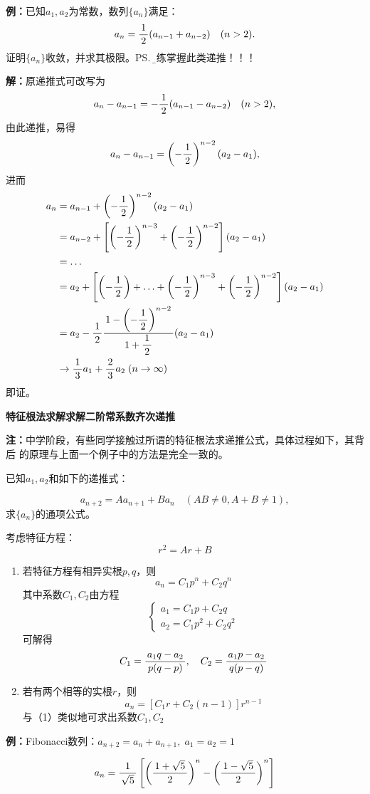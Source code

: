 {\bf 例：}已知$a_1,a_2$为常数，数列$\{a_n\}$满足：
$$a_n=\displaystyle\frac{\,{1}\,}{\,{2}\,}({a_{n-1}+a_{n-2}})\quad(n>2).$$
证明$\{a_n\}$收敛，并求其极限。\ps{\b 熟练掌握此类递推！！！}

{\bf 解：}原递推式可改写为
$$a_n-a_{n-1}=-\displaystyle\frac{\,{1}\,}{\,{2}\,}(a_{n-1}-a_{n-2})\quad(n>2),$$
由此递推，易得
$$a_n-a_{n-1}=\left(-\displaystyle\frac{\,{1}\,}{\,{2}\,}\right)^{n-2}(a_2-a_1),$$
进而
\begin{align}
	a_n&=a_{n-1}+\left(-\displaystyle\frac{\,{1}\,}{\,{2}\,}\right)^{n-2}(a_2-a_1)\notag\\
	&=a_{n-2}+\left[\left(-\displaystyle\frac{\,{1}\,}{\,{2}\,}\right)^{n-3}+\left(-\displaystyle\frac{\,{1}\,}{\,{2}\,}\right)^{n-2}\right]
	(a_2-a_1)\notag\\
	&=\ldots\notag\\
	&=a_2+\left[\left(-\displaystyle\frac{\,{1}\,}{\,{2}\,}\right)+\ldots+\left(-\displaystyle\frac{\,{1}\,}{\,{2}\,}\right)^{n-3}
	+\left(-\displaystyle\frac{\,{1}\,}{\,{2}\,}\right)^{n-2}\right](a_2-a_1)\notag\\
	&=a_2-\displaystyle\frac{\,{1}\,}{\,{2}\,}\displaystyle\frac{\,{1-\left(-\displaystyle\frac{\,{1}\,}{\,{2}\,}\right)^{n-2}}\,}{\,{1+\displaystyle\frac{\,{1}\,}{\,{2}\,}}\,}(a_2-a_1)\notag\\
	&\to\displaystyle\frac{\,{1}\,}{\,{3}\,}a_1+\displaystyle\frac{\,{2}\,}{\,{3}\,}a_2\;(n\to\infty)\notag
\end{align}
即证。

\begin{shaded}
	{\bf 特征根法求解求解二阶常系数齐次递推}
	
	{\bf 注：}中学阶段，有些同学接触过所谓的特征根法求递推公式，具体过程如下，其背后
	的原理与上面一个例子中的方法是完全一致的。
	
	已知$a_1,a_2$和如下的递推式：
	
	$$a_{n+2}=Aa_{n+1}+Ba_n\quad (AB\ne 0, A+B\ne 1),$$
	求$\{a_n\}$的通项公式。
	
	考虑特征方程：
	$$r^2=Ar+B$$
	\begin{enumerate}[(1)]
	  \setlength{\itemindent}{1cm}
	  \item 若特征方程有相异实根$p,q$，则
	  $$a_n=C_1p^n+C_2q^n$$
	  其中系数$C_1,C_2$由方程
	  $$\left\{\begin{array}{l}
	  a_1=C_1p+C_2q\\
	  a_2=C_1p^2+C_2q^2
	  \end{array}\right.$$
	  可解得
	  $$C_1=\displaystyle\frac{\,{a_1q-a_2}\,}{\,{p(q-p)}\,},\quad 
	  C_2=\displaystyle\frac{\,{a_1p-a_2}\,}{\,{q(p-q)}\,}$$
	  \item 若有两个相等的实根$r$，则
	  $$a_n=[C_1r+C_2(n-1)]r^{n-1}$$
	  与（1）类似地可求出系数$C_1,C_2$
	\end{enumerate}
	
	{\bf 例：}Fibonacci数列：$a_{n+2}=a_n+a_{n+1},\;a_1=a_2=1$
	
	$$a_n=\displaystyle\frac{\,{1}\,}{\,{\sqrt5}\,}\left[\left(\displaystyle\frac{\,{1+\sqrt5}\,}{\,{2}\,}\right)^n
	-\left(\displaystyle\frac{\,{1-\sqrt5}\,}{\,{2}\,}\right)^n\right]$$
	
\end{shaded}

